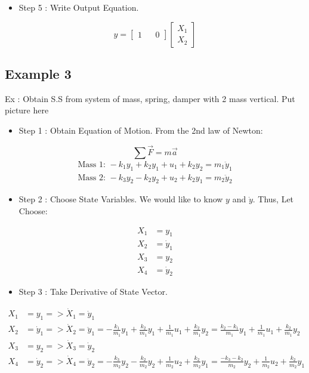 \documentclass[12pt,a4paper]{article}
\begin{document}
	\begin{itemize}
		\item Step 5 : Write Output Equation.
	\end{itemize}
	\[
	y =
	\begin{bmatrix}
		1 &   & 0 
	\end{bmatrix}
	\begin{bmatrix}
		X_1 \\
		X_2 
	\end{bmatrix}
	\]
	
	
	\subsection{Example 3}
	Ex : Obtain S.S from system of mass, spring, damper with 2 mass vertical.
	Put picture here
	\begin{itemize}
		\item Step 1 : Obtain Equation of Motion. From the 2nd law of Newton:
	\end{itemize}
	\[
	\sum \vec{F} = m\vec{a}
	\]
	\[
	\begin{split}
		\text{Mass 1: } -k_1y_1 + k_2y_1 + u_1 + k_2y_2 = m_1\ddot{y}_1 \\
		\text{Mass 2: } -k_3y_2 - k_2y_2 + u_2 + k_2y_1 = m_2\ddot{y}_2
	\end{split}
	\]
	\begin{itemize}
		\item Step 2 : Choose State Variables. We would like to know \(y\) and \(\dot{y}\). Thus, Let Choose:
	\end{itemize}
	\[
	\begin{split}
		X_1 &= y_1 \\
		X_2 &= \dot{y}_1 \\
		X_3 &= y_2 \\
		X_4 &= \dot{y}_2
	\end{split}
	\]
	\begin{itemize}
		\item Step 3 : Take Derivative of State Vector.
	\end{itemize}
	\[
	\begin{split}
		X_1 &= y_1 => \dot{X}_1 = \dot{y}_1 \\
		X_2 &= \dot{y}_1 => \dot{X}_2 = \ddot{y}_1 = -\frac{k_1}{m_1}y_1 + \frac{k_2}{m_1}y_1 + \frac{1}{m_1}u_1 + \frac{k_2}{m_1}y_2 = \frac{k_2 - k_1}{m_1}y_1 + \frac{1}{m_1}u_1 + \frac{k_2}{m_1}y_2 \\
		X_3 &= y_2 => \dot{X}_3 = \dot{y}_2 \\ 
		X_4 &= \dot{y}_2 => \dot{X}_4 = \ddot{y}_2 = -\frac{k_3}{m_2}y_2 - \frac{k_2}{m_2}y_2 + \frac{1}{m_2}u_2 + \frac{k_2}{m_2}y_1 = \frac{-k_3 - k_2}{m_2}y_2 + \frac{1}{m_2}u_2 + \frac{k_2}{m_2}y_1
	\end{split}
	\]
\end{document}
